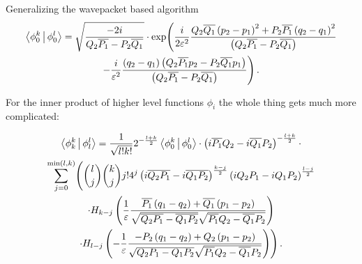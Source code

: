 \begin{chapter}{Generalizing the wavepacket based algorithm}
\begin{multline} \label{eq:multifamily_innerp_ground}
  \Braket{ \phi_0^k | \phi_0^l } =
  \sqrt{\frac{-2 i}{Q_2 \overline{P_1} - P_2 \overline{Q_1}}} \cdot
    \exp \Biggl(
      \frac{i}{2 \varepsilon^2}
      \frac{Q_2 \overline{Q_1} \left(p_2-p_1\right)^2 + P_2 \overline{P_1} \left(q_2-q_1\right)^2}
            {\left(Q_2 \overline{P_1} - P_2 \overline{Q_1}\right)}
    \\
    -\frac{i}{\varepsilon^2}
    \frac{\left(q_2-q_1\right) \left( Q_2 \overline{P_1} p_2 - P_2 \overline{Q_1} p_1\right)}
         {\left(Q_2 \overline{P_1} - P_2 \overline{Q_1}\right)}
    \Biggr) \,.
\end{multline}

For the inner product of higher level functions $\phi_i$ the whole thing gets much
more complicated:


\begin{multline}
  \Braket{ \phi_k^k | \phi_l^l } =
  \frac{1}{\sqrt{l!k!}} 2^{-\frac{l+k}{2}} \Braket{ \phi_0^k | \phi_0^l } \cdot
  \left(i \overline{ P_1} Q_2 - i \overline{Q_1} P_2\right)^{-\frac{l+k}{2}} \cdot \\
  \sum_{j=0}^{\min\left(l,k\right)}
    \Biggl(
      \binom{l}{j} \binom{k}{j} j! 4^j \left(i \overline{Q_2 P_1}-i\overline{Q_1 P_2}\right)^{\frac{k-j}{2}}
      \left(i Q_2  P_1 - i Q_1  P_2\right)^{\frac{l-j}{2}}
      \\
      \cdot H_{k-j}\left(\frac{1}{\varepsilon}
                   \frac{\overline{ P_1}\left(q_1-q_2\right)+\overline{Q_1}\left(p_1-p_2\right)}
                        {\sqrt{\overline{Q_2 P_1}-\overline{Q_1 P_2}}\sqrt{\overline{ P_1}Q_2-\overline{Q_1} P_2}}\right)
      \\
      \cdot H_{l-j}\left(-\frac{1}{\varepsilon}
                    \frac{-P_2\left(q_1-q_2\right)+Q_2\left(p_1-p_2\right)}
                         {\sqrt{Q_2 P_1 - Q_1 P_2}\sqrt{\overline{P_1}Q_2-\overline{Q_1} P_2}}\right)
    \Biggr) \,.
\end{multline}


\end{chapter}
